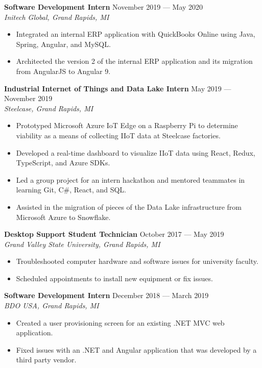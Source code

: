 \documentclass{article}
\begin{document}
\textbf{Software Development Intern} \hfill November 2019 --- May 2020\\
\textit{Initech Global, Grand Rapids, MI}
\begin{itemize}
\item Integrated an internal ERP application with QuickBooks Online using Java,
  Spring, Angular, and MySQL.
\item Architected the version 2 of the internal ERP application and its migration
  from AngularJS to Angular 9.
\end{itemize}
\medskip


\textbf{Industrial Internet of Things and Data Lake Intern}
\hfill May 2019 --- November 2019\\
\textit{Steelcase, Grand Rapids, MI}
\begin{itemize}
\item Prototyped Microsoft Azure IoT Edge on a Raspberry Pi to determine
  viability as a means of collecting IIoT data at Steelcase factories.
\item Developed a real-time dashboard to visualize IIoT data using React, Redux,
  TypeScript, and Azure SDKs.
\item Led a group project for an intern hackathon and mentored teammates in
  learning Git, C\#, React, and SQL.
\item Assisted in the migration of pieces of the Data Lake infrastructure from
  Microsoft Azure to Snowflake.
\end{itemize}
\medskip


\textbf{Desktop Support Student Technician} \hfill October 2017 --- May 2019\\
\textit{Grand Valley State University, Grand Rapids, MI}
\begin{itemize}
\item Troubleshooted computer hardware and software issues for university faculty.
\item Scheduled appointments to install new equipment or fix issues.
\end{itemize}
\medskip

\textbf{Software Development Intern} \hfill December 2018 --- March 2019\\
\textit{BDO USA, Grand Rapids, MI}
\begin{itemize}
\item Created a user provisioning screen for an existing .NET MVC web application.
\item Fixed issues with an .NET and Angular application that was developed by a
  third party vendor.
\end{itemize}
\medskip
\end{document}

